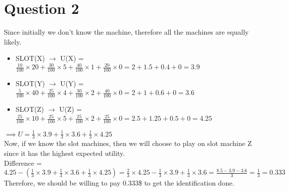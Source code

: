 \documentclass[letter, 10pt]{article}
\begin{document}
\section*{Question 2}
Since initially we don't know the machine, therefore all the machines are equally likely.
\begin{itemize}
    \item SLOT(X) $\rightarrow$ U(X) = $\frac{10}{100}\times20+\frac{30}{100}\times5+\frac{40}{100}\times1+\frac{20}{100}\times0 = 2+1.5+0.4+0 = 3.9$
    \item SLOT(Y) $\rightarrow$ U(Y) = $\frac{5}{100}\times40+\frac{25}{100}\times4+\frac{30}{100}\times2+\frac{40}{100}\times0 = 2+1+0.6+0 = 3.6$
    \item SLOT(Z) $\rightarrow$ U(Z) = $\frac{25}{100}\times10+\frac{25}{100}\times5+\frac{25}{100}\times2+\frac{25}{100}\times0 = 2.5+1.25+0.5+0 = 4.25$
\end{itemize}
$\implies U = \frac{1}{3}\times3.9+\frac{1}{3}\times3.6+\frac{1}{3}\times4.25$\\
Now, if we know the slot machines, then we will choose to play on slot machine Z since it has the highest expected utility.\\
Difference = $4.25-(\frac{1}{3}\times3.9+\frac{1}{3}\times3.6+\frac{1}{3}\times4.25) = \frac{2}{3}\times4.25 - \frac{1}{3}\times3.9+\frac{1}{3}\times3.6 = \frac{8.5-3.9-3.6}{3} = \frac{1}{3} = 0.333$\\
Therefore, we should be willing to pay 0.333\$ to get the identification done.
\end{document}
